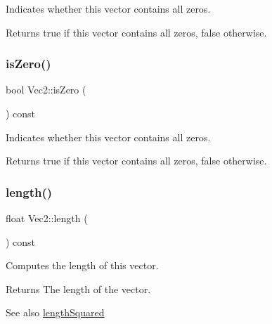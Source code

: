Indicates whether this vector contains all zeros.

\begin{DoxyReturn}{Returns}
true if this vector contains all zeros, false otherwise. 
\end{DoxyReturn}
\mbox{\label{classVec2_ad399155b1760c192c1afafdb5d7ccea3}} 
\subsubsection{\texorpdfstring{is\+Zero()}{isZero()}\hspace{0.1cm}{\footnotesize\ttfamily [2/2]}}
{\footnotesize\ttfamily bool Vec2\+::is\+Zero (\begin{DoxyParamCaption}{ }\end{DoxyParamCaption}) const\hspace{0.3cm}{\ttfamily [inline]}}

Indicates whether this vector contains all zeros.

\begin{DoxyReturn}{Returns}
true if this vector contains all zeros, false otherwise. 
\end{DoxyReturn}
\mbox{\label{classVec2_af9ebf7c8888fd5df9514e6d519b99fb2}} 
\subsubsection{\texorpdfstring{length()}{length()}\hspace{0.1cm}{\footnotesize\ttfamily [1/2]}}
{\footnotesize\ttfamily float Vec2\+::length (\begin{DoxyParamCaption}{ }\end{DoxyParamCaption}) const}

Computes the length of this vector.

\begin{DoxyReturn}{Returns}
The length of the vector.
\end{DoxyReturn}
\begin{DoxySeeAlso}{See also}
\hyperlink{classVec2_a5dbc5e767907b2e217060479c52777bb}{length\+Squared} 
\end{DoxySeeAlso}
\mbox{\label{classVec2_af9ebf7c8888fd5df9514e6d519b99fb2}} 
